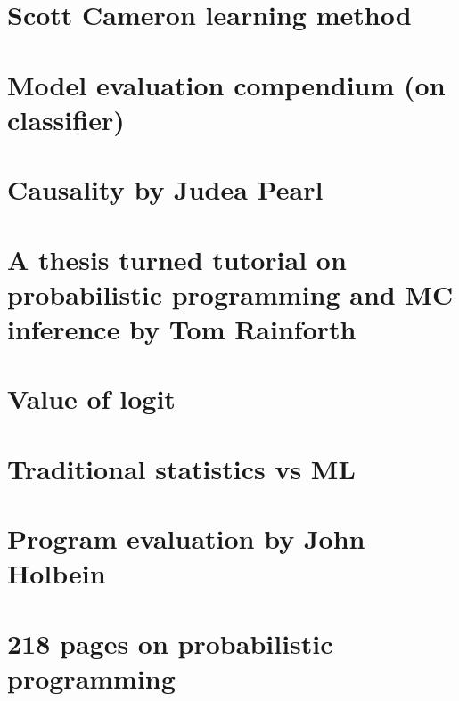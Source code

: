 \documentclass[letterpaper,10pt,english]{sphinxmanual}
\begin{document}
\section{Scott Cameron learning method}
\label{\detokenize{tweets:scott-cameron-learning-method}}



\section{Model evaluation compendium (on classifier)}
\label{\detokenize{tweets:model-evaluation-compendium-on-classifier}}



\section{Causality by Judea Pearl}
\label{\detokenize{tweets:causality-by-judea-pearl}}



\section{A thesis turned tutorial on probabilistic programming and MC inference by Tom Rainforth}
\label{\detokenize{tweets:a-thesis-turned-tutorial-on-probabilistic-programming-and-mc-inference-by-tom-rainforth}}



\section{Value of logit}
\label{\detokenize{tweets:value-of-logit}}



\section{Traditional statistics vs ML}
\label{\detokenize{tweets:traditional-statistics-vs-ml}}



\section{Program evaluation by John Holbein}
\label{\detokenize{tweets:program-evaluation-by-john-holbein}}



\section{218 pages on probabilistic programming}
\label{\detokenize{tweets:pages-on-probabilistic-programming}}
\end{document}
